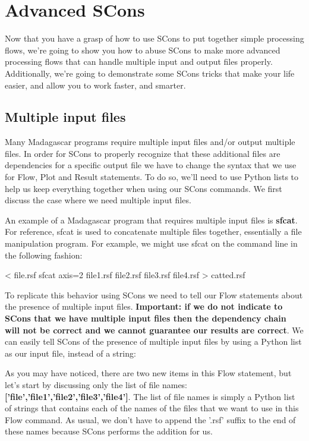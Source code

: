 \section{Advanced SCons}

Now that you have a grasp of how to use SCons to put together simple processing flows, we're going to show you how to abuse SCons to make more advanced processing flows that can handle multiple input and output files properly.  Additionally, we're going to demonstrate some SCons tricks that make your life easier, and allow you to work faster, and smarter.

\subsection{Multiple input files}

Many Madagascar programs require multiple input files and/or output multiple files.  In order for SCons to properly recognize that these additional files are dependencies for a specific output file we have to change the syntax that we use for Flow, Plot and Result statements.  To do so, we'll need to use Python lists to help us keep everything together when using our SCons commands.  We first discuss the case where we need multiple input files.  

An example of a Madagascar program that requires multiple input files is \textbf{sfcat}.  For reference, sfcat is used to concatenate multiple files together, essentially a file manipulation program.  For example, we might use sfcat on the command line in the following fashion:
\begin{verbatimtab}[4]
< file.rsf sfcat axis=2 
    file1.rsf file2.rsf file3.rsf file4.rsf > catted.rsf
\end{verbatimtab}
To replicate this behavior using SCons we need to tell our Flow statements about the presence of multiple input files.  \textbf{Important: if we do not indicate to SCons that we have multiple input files then the dependency chain will not be correct and we cannot guarantee our results are correct}.  We can easily tell SCons of the presence of multiple input files by using a Python list as our input file, instead of a string:
As you may have noticed, there are two new items in this Flow statement, but let's start by discussing only the list of file names: \textbf{['file','file1','file2','file3','file4']}.  The list of file names is simply a Python list of strings that contains each of the names of the files that we want to use in this Flow command.  As usual, we don't have to append the '.rsf' suffix to the end of these names because SCons performs the addition for us.  


